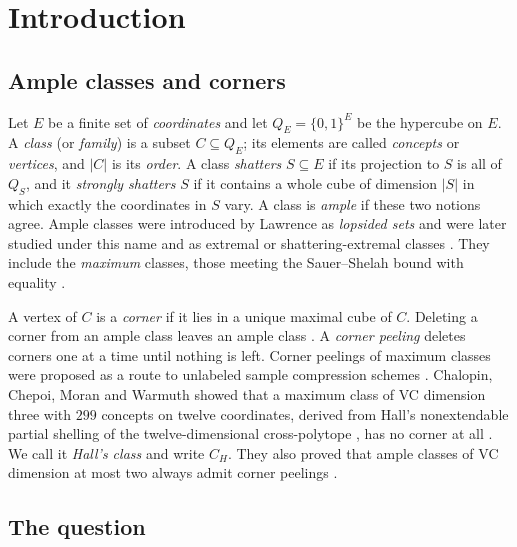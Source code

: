 \documentclass[11pt]{article}
\numberwithin{equation}{section}
\theoremstyle{definition}
\theoremstyle{remark}
\begin{document}
\section{Introduction}
\label{sec:intro}

\subsection{Ample classes and corners}

Let \(E\) be a finite set of \emph{coordinates} and let
\(Q_E=\{0,1\}^E\) be the hypercube on \(E\).  A \emph{class} (or
\emph{family}) is a subset \(C\subseteq Q_E\); its elements are called
\emph{concepts} or \emph{vertices}, and \(|C|\) is its \emph{order}.  A class
\emph{shatters} \(S\subseteq E\) if its projection to \(S\) is all of
\(Q_S\), and it \emph{strongly shatters} \(S\) if it contains a whole cube of
dimension \(|S|\) in which exactly the coordinates in \(S\) vary.  A class is
\emph{ample} if these two notions agree.  Ample classes were introduced by
Lawrence as \emph{lopsided sets} \cite{Lawrence83} and were later studied
under this name and as extremal or shattering-extremal classes
\cite{BandeltCDK06,Bollobas95,Anstee2002,Moran2012}.  They include the
\emph{maximum} classes, those meeting the Sauer--Shelah bound with
equality \cite{Sauer1972Density,Floyd95}.

A vertex of \(C\) is a \emph{corner} if it lies in a unique maximal cube of
\(C\).  Deleting a corner from an ample class leaves an ample class
\cite[Lemma~4.1]{ChalopiChepoiMoran22}.  A \emph{corner peeling} deletes
corners one at a time until nothing is left.  Corner peelings of maximum
classes were proposed as a route to unlabeled sample compression schemes
\cite{Kuzmin06,Rubinstein2009a}.  Chalopin, Chepoi, Moran and Warmuth showed
that a maximum class of VC dimension three with \(299\) concepts on twelve
coordinates, derived from Hall's nonextendable partial shelling of the
twelve-dimensional cross-polytope \cite{Hall04}, has no corner at all
\cite[Theorem~4.5]{ChalopiChepoiMoran22}.  We call it \emph{Hall's class}
and write \(C_H\).  They also proved that ample classes of VC dimension at
most two always admit corner peelings
\cite[Proposition~4.11]{ChalopiChepoiMoran22}.

\subsection{The question}
\end{document}
